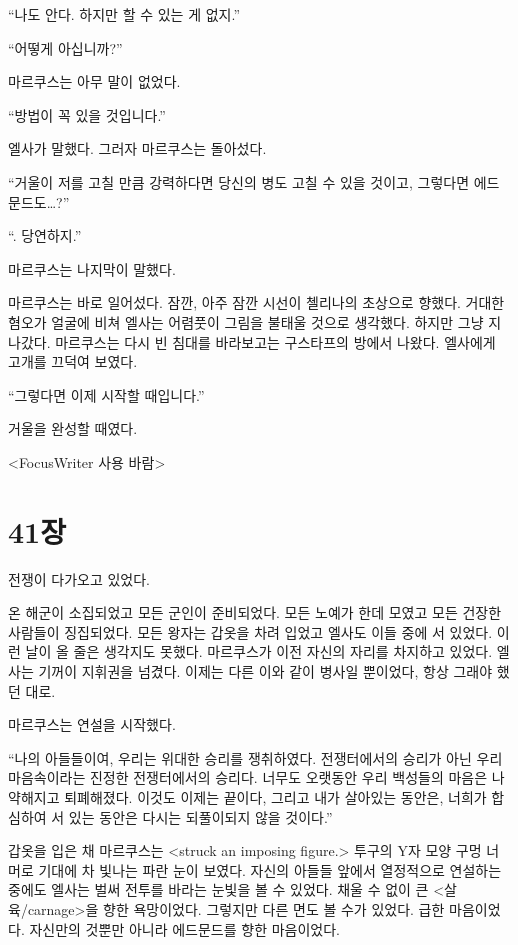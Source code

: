 ``나도 안다. 하지만 할 수 있는 게 없지.''

``어떻게 아십니까?''

마르쿠스는 아무 말이 없었다.

``방법이 꼭 있을 것입니다.''

엘사가 말했다. 그러자 마르쿠스는 돌아섰다.

``거울이 저를 고칠 만큼 강력하다면 당신의 병도 고칠 수 있을 것이고, 그렇다면 에드문드도\ldots?''

``. 당연하지.''

마르쿠스는 나지막이 말했다.

마르쿠스는 바로 일어섰다. 잠깐, 아주 잠깐 시선이 첼리나의 초상으로 향했다. 거대한 혐오가 얼굴에 비쳐 엘사는 어렴풋이 그림을 불태울 것으로 생각했다. 하지만 그냥 지나갔다. 마르쿠스는 다시 빈 침대를 바라보고는 구스타프의 방에서 나왔다. 엘사에게 고개를 끄덕여 보였다.

``그렇다면 이제 시작할 때입니다.''

거울을 완성할 때였다.

﻿<FocusWriter 사용 바람>


\chapter[41장  ~~][41장\hspace*{.5em}~~]{41장 \ ~~}



전쟁이 다가오고 있었다.

온 해군이 소집되었고 모든 군인이 준비되었다. 모든 노예가 한데 모였고 모든 건장한 사람들이 징집되었다. 모든 왕자는 갑옷을 차려 입었고 엘사도 이들 중에 서 있었다. 이런 날이 올 줄은 생각지도 못했다. 마르쿠스가 이전 자신의 자리를 차지하고 있었다. 엘사는 기꺼이 지휘권을 넘겼다. 이제는 다른 이와 같이 병사일 뿐이었다, 항상 그래야 했던 대로.

마르쿠스는 연설을 시작했다.

``나의 아들들이여, 우리는 위대한 승리를 쟁취하였다. 전쟁터에서의 승리가 아닌 우리 마음속이라는 진정한 전쟁터에서의 승리다. 너무도 오랫동안 우리 백성들의 마음은 나약해지고 퇴폐해졌다. 이것도 이제는 끝이다, 그리고 내가 살아있는 동안은, 너희가 합심하여 서 있는 동안은 다시는 되풀이되지 않을 것이다.''

갑옷을 입은 채 마르쿠스는 <struck an imposing figure.> 투구의 Y자 모양 구멍 너머로 기대에 차 빛나는 파란 눈이 보였다. 자신의 아들들 앞에서 열정적으로 연설하는 중에도 엘사는 벌써 전투를 바라는 눈빛을 볼 수 있었다. 채울 수 없이 큰 <살육/carnage>을 향한 욕망이었다. 그렇지만 다른 면도 볼 수가 있었다. 급한 마음이었다. 자신만의 것뿐만 아니라 에드문드를 향한 마음이었다.

